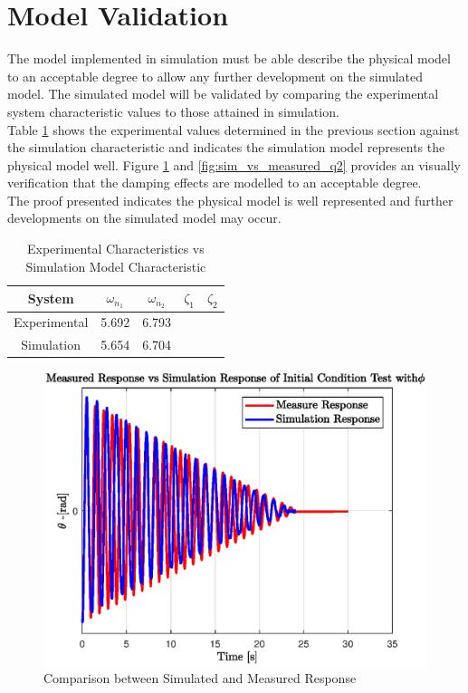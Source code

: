 \section{Model Validation}
The model implemented in simulation must be able describe the physical model to an acceptable degree to allow any further development on the simulated model. The simulated model will be validated by comparing the experimental system characteristic values to those attained in simulation.\\

Table \ref{table:experiment_vs_simulation} shows the experimental values determined in the previous section against the simulation characteristic and indicates the simulation model represents the physical model well. Figure \ref{fig:sim_vs_measured_q1} and \ref{fig:sim_vs_measured_q2} provides an visually verification that the damping effects are modelled to an acceptable degree.\\

The proof presented indicates the physical model is well represented and further developments on the simulated model may occur.\\


\begin{table}[]
	\centering
	\begin{tabular}{|c|c|c|c|c|}
		\hline
		System & $\omega_{n_{1}}$  & $\omega_{n_{2}}$  & $\zeta_{1}$ & $\zeta_{2}$ \\
		\hline
		\hline
		Experimental  & 5.692 &  6.793 & & \\
		\hline
		Simulation & 5.654 & 6.704 & & \\ 
		\hline
	\end{tabular}
	\caption{Experimental Characteristics vs Simulation Model Characteristic}
	\label{table:experiment_vs_simulation}
\end{table}

\begin{figure}[h]
	\centering
	\includegraphics[scale=1]{./figs/sim_vs_measured_q1.eps}
	\caption{Comparison between Simulated and Measured Response}
	\label{fig:sim_vs_measured_q1}
\end{figure}


